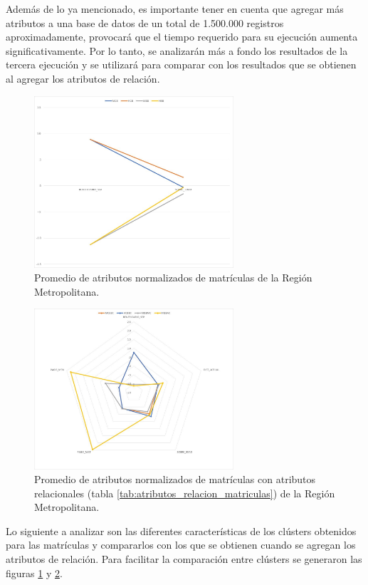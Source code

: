 Además de lo ya mencionado, es importante tener en cuenta que agregar más atributos a una base de datos de un total de 1.500.000 registros aproximadamente, provocará que el tiempo requerido para su ejecución aumenta significativamente. Por lo tanto, se analizarán más a fondo los resultados de la tercera ejecución y se utilizará para comparar con los resultados que se obtienen al agregar los atributos de relación.

\begin{figure}[hc]
    \centering
    \includegraphics[width=0.66\textwidth]{images/chart_matriculas_sin.jpg}
    \caption{Promedio de atributos normalizados de matrículas de la Región Metropolitana.}
    \label{fig:chart_mat}
\end{figure}

\begin{figure}[hc]
    \centering
    \includegraphics[width=0.66\textwidth]{images/radar_chart_matriculas_con.jpg}
    \caption{Promedio de atributos normalizados de matrículas con atributos relacionales (tabla \ref{tab:atributos_relacion_matriculas}) de la Región Metropolitana.}
    \label{fig:radar_mat_rel}
\end{figure}

Lo siguiente a analizar son las diferentes características de los clústers obtenidos para las matrículas y compararlos con los que se obtienen cuando se agregan los atributos de relación. Para facilitar la comparación entre clústers se generaron las figuras \ref{fig:chart_mat} y \ref{fig:radar_mat_rel}.